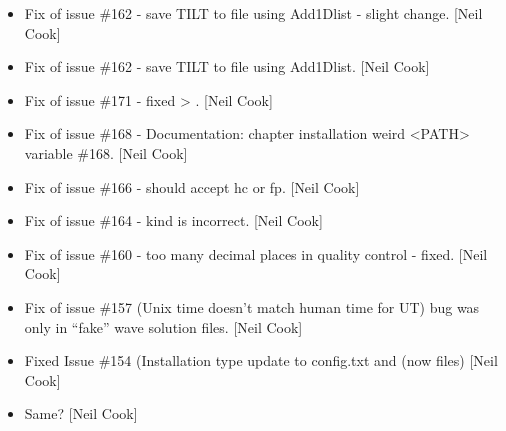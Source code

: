 \documentclass[a4paper,10pt,english]{report}
\begin{document}
\begin{itemize}
\item {} 
Fix of issue \#162 -  save TILT to file using Add1Dlist -
slight change. {[}Neil Cook{]}

\item {} 
Fix of issue \#162 -  save TILT to file using Add1Dlist. {[}Neil
Cook{]}

\item {} 
Fix of issue \#171 - fixed  \textendash{}\textgreater{}
. {[}Neil Cook{]}

\item {} 
Fix of issue \#168 - Documentation: chapter installation weird \textless{}PATH\textgreater{}
variable \#168. {[}Neil Cook{]}

\item {} 
Fix of issue \#166 -  should accept hc or fp. {[}Neil Cook{]}

\item {} 
Fix of issue \#164 -  kind is incorrect. {[}Neil Cook{]}

\item {} 
Fix of issue \#160 - too many decimal places in quality control -
fixed. {[}Neil Cook{]}

\item {} 
Fix of issue \#157 (Unix time doesn’t match human time for UT) bug was
only in “fake” wave solution files. {[}Neil Cook{]}

\item {} 
Fixed Issue \#154 (Installation type update to config.txt and
 (now  files) {[}Neil Cook{]}

\item {} 
Same? {[}Neil Cook{]}

\end{itemize}
\end{document}
